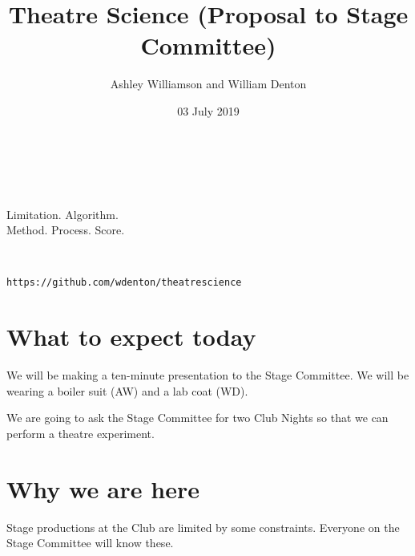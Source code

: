 \documentclass[12pt]{article}
\title{Theatre Science (Proposal to Stage Committee)}
\author{Ashley Williamson and William Denton}
\date{03 July 2019}
\begin{document}
\begin{center}


  \vspace{2cm}

  \\
  \vspace{0.5cm}
  \\

  \vspace{3cm}

  {\Huge \ttfamily
    Limitation. Algorithm. \\
    Method.  Process.  Score.

  }

\vspace{5cm}

\\

\vfill

\ccby

\texttt{https://github.com/wdenton/theatrescience}

\end{center}

\clearpage

\section{What to expect today}

We will be making a ten-minute presentation to the Stage Committee.  We will be wearing a boiler suit (AW) and a lab coat (WD).

We are going to ask the Stage Committee for two Club Nights so that we can perform a theatre experiment.


\section{Why we are here}

Stage productions at the Club are limited by some constraints.  Everyone on the Stage Committee will know these.
\end{document}
